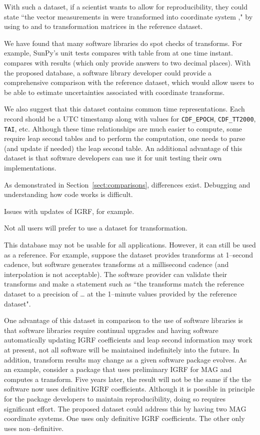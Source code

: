 \documentclass[draft]{agujournal2019}
\begin{document}
With such a dataset, if a scientist wants to allow for reproducibility, they could state ``the vector measurements in  were transformed into coordinate system ," by using  to  and  to  transformation matrices in the reference dataset.

We have found that many software libraries do spot checks of transforms. For example, SunPy's unit tests \cite{SunPy} compares with table from  at one time instant. \cite{cxform} compares with  results (which only provide answers to two decimal places). With the proposed database, a software library developer could provide a comprehensive comparison with the reference dataset, which would allow users to be able to estimate uncertainties associated with coordinate transforms.

We also suggest that this dataset contains common time representations. Each record should be a UTC timestamp along with values for \texttt{CDF\_EPOCH}, \texttt{CDF\_TT2000}, \texttt{TAI}, etc. Although these time relationships are much easier to compute, some require leap second tables and to perform the computation, one needs to parse (and update if needed) the leap second table. An additional advantage of this dataset is that software developers can use it for unit testing their own implementations.

As demonstrated in Section~\ref{sect:comparisons}, differences exist. Debugging and understanding how code works is difficult.

Issues with updates of IGRF, for example.

Not all users will prefer to use a dataset for transformation.

This database may not be usable for all applications. However, it can still be used as a reference. For example, suppose the dataset provides transforms at 1--second cadence, but software generates transforms at a millisecond cadence (and interpolation is not acceptable). The software provider can validate their transforms and make a statement such as ``the transforms match the reference dataset to a precision of … at the 1--minute values provided by the reference dataset".

One advantage of this dataset in comparison to the use of software libraries is that software libraries require continual upgrades and having software automatically updating IGRF coefficients and leap second information may work at present, not all software will be maintained indefinitely into the future. In addition, transform results may change as a given software package evolves. As an example, consider a package that uses preliminary IGRF for MAG and computes a transform. Five years later, the result will not be the same if the the software now uses definitive IGRF coefficients. Although it is possible in principle for the package developers to maintain reproducibility, doing so requires significant effort. The proposed dataset could address this by having two MAG coordinate systems. One uses only definitive IGRF coefficients. The other only uses non--definitive.
\end{document}
